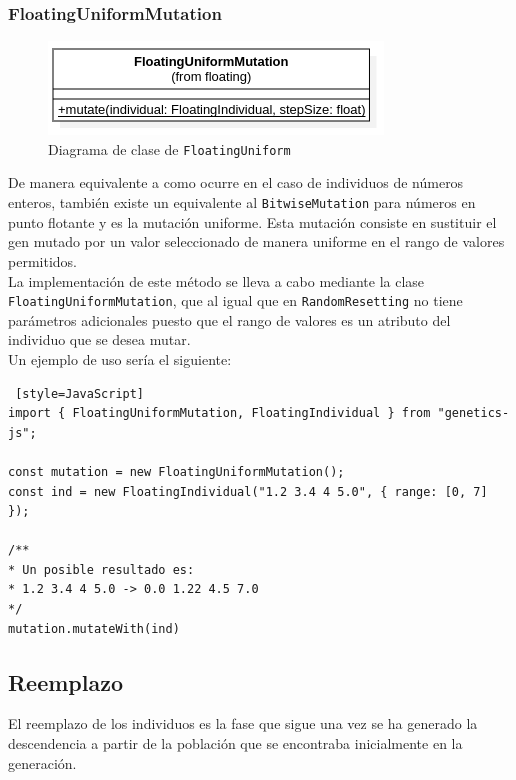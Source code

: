 \subsubsection{FloatingUniformMutation}

\begin{figure}[ht]
    \centering
    \includegraphics[scale=0.4]{mem/images/cap-4/4.2.7(Mutation)/FloatingUniformMutation.png}
    \caption{Diagrama de clase de \texttt{FloatingUniform}}
    \label{fig:my_label}
\end{figure}

De manera equivalente a como ocurre en el caso de individuos de números enteros, también existe un equivalente al \texttt{BitwiseMutation} para números en punto flotante y es la mutación uniforme. Esta mutación consiste en sustituir el gen mutado por un valor seleccionado de manera uniforme en el rango de valores permitidos. \\

La implementación de este método se lleva a cabo mediante la clase \texttt{FloatingUniformMutation}, que al igual que en \texttt{RandomResetting} no tiene parámetros adicionales puesto que el rango de valores es un atributo del individuo que se desea mutar.\\

Un ejemplo de uso sería el siguiente: \\

\begin{lstlisting} [style=JavaScript]
import { FloatingUniformMutation, FloatingIndividual } from "genetics-js";

const mutation = new FloatingUniformMutation();
const ind = new FloatingIndividual("1.2 3.4 4 5.0", { range: [0, 7] });

/**
* Un posible resultado es:
* 1.2 3.4 4 5.0 -> 0.0 1.22 4.5 7.0
*/
mutation.mutateWith(ind)
\end{lstlisting}


\subsection{Reemplazo}

El reemplazo de los individuos es la fase que sigue una vez se ha generado la descendencia a partir de la población que se encontraba inicialmente en la generación. \\


